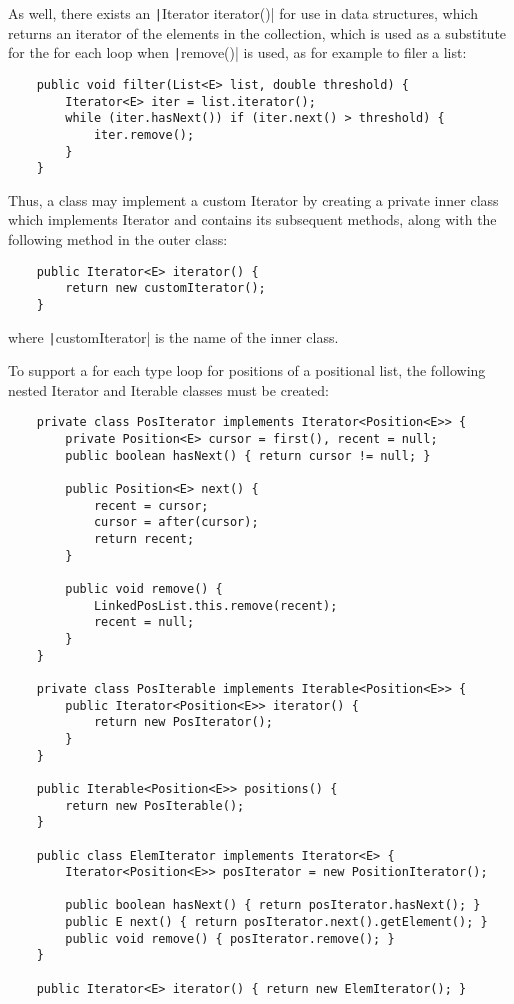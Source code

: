 \documentclass[12pt, letterpaper]{article}
\begin{document}
\bigskip
As well, there exists an \texttt|Iterator iterator()| for use in data structures, which returns an iterator of the elements in the collection, which is used as a substitute for the for each loop when \texttt|remove()| is used, as for example to filer a list:
\begin{verbatim}
    public void filter(List<E> list, double threshold) {
        Iterator<E> iter = list.iterator();
        while (iter.hasNext()) if (iter.next() > threshold) {
            iter.remove();
        }
    }
\end{verbatim}
Thus, a class may implement a custom Iterator by creating a private inner class which implements Iterator and contains its subsequent methods, along with the following method in the outer class:
\begin{verbatim}
    public Iterator<E> iterator() {
        return new customIterator();
    }
\end{verbatim}
where \texttt|customIterator| is the name of the inner class.

\bigskip
To support a for each type loop for positions of a positional list, the following nested Iterator and Iterable classes must be created:
\begin{verbatim}
    private class PosIterator implements Iterator<Position<E>> {
        private Position<E> cursor = first(), recent = null;
        public boolean hasNext() { return cursor != null; }

        public Position<E> next() {
            recent = cursor;
            cursor = after(cursor);
            return recent;
        }

        public void remove() {
            LinkedPosList.this.remove(recent);
            recent = null;
        }
    }

    private class PosIterable implements Iterable<Position<E>> {
        public Iterator<Position<E>> iterator() {
            return new PosIterator();
        }
    }

    public Iterable<Position<E>> positions() {
        return new PosIterable();
    }

    public class ElemIterator implements Iterator<E> {
        Iterator<Position<E>> posIterator = new PositionIterator();

        public boolean hasNext() { return posIterator.hasNext(); }
        public E next() { return posIterator.next().getElement(); }
        public void remove() { posIterator.remove(); }
    }

    public Iterator<E> iterator() { return new ElemIterator(); }
\end{verbatim}
\end{document}
